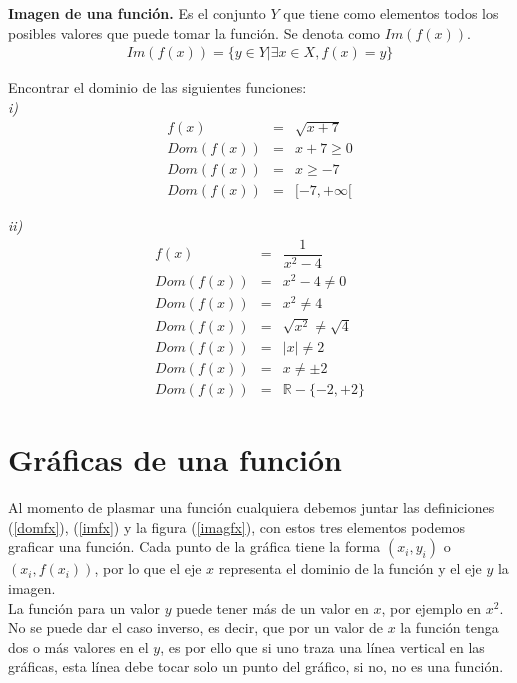 \begin{mydef}
\textbf{Imagen de una función.} Es el conjunto $Y$ que tiene como elementos todos los posibles valores que puede tomar la función. Se denota como $Im(f(x))$.
\begin{eqnarray}
Im(f(x))=\{y\in Y|\exists x\in X,f(x)=y \}
\end{eqnarray}
\label{imfx}
\end{mydef}

\begin{myexample} Encontrar el dominio de las siguientes funciones:\\

\noindent\textit{i)}
\begin{eqnarray*}
f(x)&=&\sqrt{x+7}\\
Dom(f(x))&=& x+7\geq 0\\
Dom(f(x))&=& x\geq -7\\
Dom(f(x))&=& [-7,+\infty [
\end{eqnarray*}

\noindent\textit{ii)}
\begin{eqnarray*}
f(x)&=&\dfrac{1}{x^{2}-4}\\
Dom(f(x))&=& x^{2}-4\neq 0 \\
Dom(f(x))&=& x^{2}\neq 4 \\
Dom(f(x))&=& \sqrt{x^{2}}\neq \sqrt{4} \\
Dom(f(x))&=& |x|\neq 2 \\
Dom(f(x))&=& x\neq \pm 2 \\
Dom(f(x))&=& \mathbb{R}-\{-2,+2\}
\end{eqnarray*}
\end{myexample}

\section{Gráficas de una función}
Al momento de plasmar una función cualquiera debemos juntar las definiciones (\ref{domfx}), (\ref{imfx}) y la figura (\ref{imagfx}), con estos tres elementos podemos graficar una función. Cada punto de la gráfica tiene la forma $(x_{i},y_{i})$ o $(x_{i},f(x_{i}))$, por lo que el eje $x$ representa el dominio de la función y el eje $y$ la imagen. \\
La función para un valor $y$ puede tener más de un valor en $x$, por ejemplo en $x^{2}$. No se puede dar el caso inverso, es decir, que por un valor de $x$ la función tenga dos o más valores en el $y$, es por ello que si uno traza una línea vertical en las gráficas, esta línea debe tocar solo un punto del gráfico, si no, no es una función.\\

